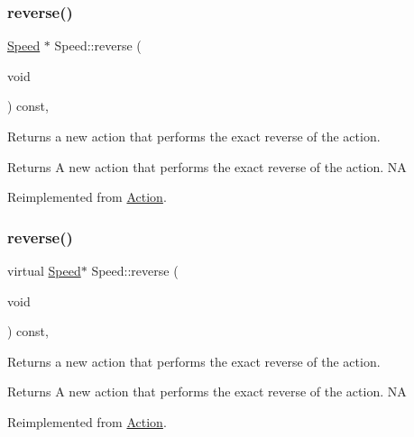 \subsubsection{\texorpdfstring{reverse()}{reverse()}\hspace{0.1cm}{\footnotesize\ttfamily [1/2]}}
{\footnotesize\ttfamily \hyperlink{classSpeed}{Speed} $\ast$ Speed\+::reverse (\begin{DoxyParamCaption}\item[{void}]{ }\end{DoxyParamCaption}) const\hspace{0.3cm}{\ttfamily [override]}, {\ttfamily [virtual]}}

Returns a new action that performs the exact reverse of the action.

\begin{DoxyReturn}{Returns}
A new action that performs the exact reverse of the action.  NA 
\end{DoxyReturn}


Reimplemented from \hyperlink{classAction_a2f06b574c4f066a3f11854a77c456227}{Action}.

\mbox{\label{classSpeed_a7712f6aa442c6b93306e78c1d18f54d4}} 
\subsubsection{\texorpdfstring{reverse()}{reverse()}\hspace{0.1cm}{\footnotesize\ttfamily [2/2]}}
{\footnotesize\ttfamily virtual \hyperlink{classSpeed}{Speed}$\ast$ Speed\+::reverse (\begin{DoxyParamCaption}\item[{void}]{ }\end{DoxyParamCaption}) const\hspace{0.3cm}{\ttfamily [override]}, {\ttfamily [virtual]}}

Returns a new action that performs the exact reverse of the action.

\begin{DoxyReturn}{Returns}
A new action that performs the exact reverse of the action.  NA 
\end{DoxyReturn}


Reimplemented from \hyperlink{classAction_a2f06b574c4f066a3f11854a77c456227}{Action}.

\mbox{\label{classSpeed_abc885c86093d27f1c120ba094beb042d}} 
